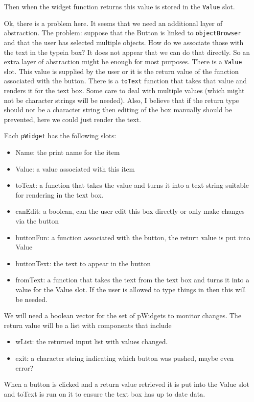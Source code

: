 \documentclass{article}
\begin{document}
Then when the widget function returns this value is stored in the
\verb+Value+ slot.

Ok, there is a problem here. It seems that we need an additional layer
of abstraction.
The problem: suppose that the Button is linked to \verb+objectBrowser+
and that the user has selected multiple objects. How do we associate
those with the text in the typein box?
It does not appear that we can do that directly.
So an extra layer of abstraction might be enough for most purposes.
There is a \verb+Value+ slot. This value is supplied by the user or 
it is the return value of the function associated with the button.
There is a \verb+toText+ function that takes that value and renders it
for the text box.
Some care to deal with multiple values (which might not be character
strings will be needed).
Also, I believe that if the return type should not be a character
string then editing of the box manually should be prevented, here we
could just render the text.

Each \verb+pWidget+ has the following slots:
\begin{itemize}
\item Name: the print name for the item
\item Value: a value associated with this item
\item toText: a function that takes the value and turns it into a text
  string suitable for rendering in the text box.
\item canEdit: a boolean, can the user edit this box directly or only
  make changes via the button
\item buttonFun: a function associated with the button, the return
  value is put into Value
\item buttonText: the text to appear in the button
\item fromText: a function that takes the text from the text box and
  turns it into a value for the Value slot. If the user is allowed to
  type things in then this will be needed.
\end{itemize}

We will need a boolean vector for the set of pWidgets to monitor
changes.
The return value will be a list with components that include
\begin{itemize}
\item wList: the returned input list with values changed.
\item exit: a character string indicating which button was pushed,
  maybe even error?
\end{itemize}

When a button is clicked and a return value retrieved it is put into
the Value slot and toText is run on it to ensure the text box has up
to date data.
\end{document}
